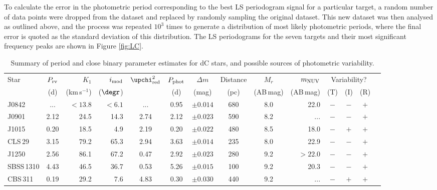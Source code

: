 \documentclass[fleqn,usenatbib,useAMS]{mnras}
\begin{document}
To calculate the error in the photometric period corresponding to the best LS periodogram signal for a particular target, a random number of data points were dropped from the dataset and replaced by randomly sampling the original dataset.  This new dataset was then analysed as outlined above, and the process was repeated $10^3$ times to generate a distribution of most likely photometric periods, where the final error is quoted as the standard deviation of this distribution.  The LS periodograms for the seven targets and their most significant frequency peaks are shown in Figure \ref{fig:LC}.  




\begin{table*}
\centering
\caption{Summary of period and close binary parameter estimates for dC stars, and possible sources of photometric variability.}
\label{tab:Summary}
\begin{tabular}{lcrrcccccrcccc} 
\hline

Star			&$P_{\rm rv}$	&$K_1$		&$i_{\rm mod}$ &$\upchi^{2}_{\rm red}$	&$P_{\rm phot}$	&$\Delta m$	&Distance	&$M_r$	&$m_{\rm NUV}$&\multicolumn{3}{c}{Variability?}\\	
			&(d)			&(km\,s$^{-1}$)	&($\degr$) 	&					&(d)				&(mag)		&(pc)	&(AB\,mag)&(AB\,mag)	&(T)&(I)&(R)\\

\hline	

J0842		&...			&$<13.8$		&$<6.1$		&...					&0.95			&$\pm0.014$	&680		&8.0		&22.0		&$-$	&$-$	&$+$\\
J0901		&2.12		&24.5		&14.3		&2.74				&2.12			&$\pm0.023$	&590		&8.2		&...			&$-$	&$-$	&$+$\\
J1015		&0.20		&18.5		&4.9			&2.19				&0.20			&$\pm0.022$	&480		&8.5		&18.0		&$-$	&$+$&$+$\\
CLS\,29		&3.15		&79.2		&65.3		&2.94				&3.63			&$\pm0.014$	&235		&8.0		&22.9		&$-$ &$-$ &$+$\\
J1250		&2.56		&86.1		&67.2		&0.47				&2.92			&$\pm0.023$	&280		&9.2		&$>22.0$		&$-$	&$-$	&$+$\\
SBSS\,1310	&4.43		&46.5		&36.7		&0.53				&5.26			&$\pm0.015$	&100		&9.2		&20.3		&$-$	&$-$	&$+$\\
CBS\,311		&0.19		&29.2		&7.6			&4.83				&0.30			&$\pm0.030$	&440		&9.2		&...			&$-$	&$+$&$+$\\
		

\end{tabular}
\end{table*}
\end{document}
